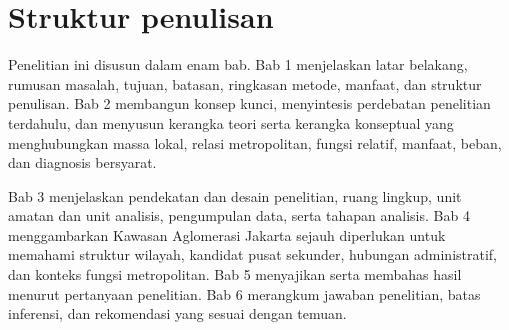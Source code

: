 \documentclass[11pt,a4paper,oneside,openany,indonesian]{report}
\begin{document}
\section{Struktur penulisan}

Penelitian ini disusun dalam enam bab. Bab 1 menjelaskan latar belakang, rumusan masalah, tujuan, batasan, ringkasan metode, manfaat, dan struktur penulisan. Bab 2 membangun konsep kunci, menyintesis perdebatan penelitian terdahulu, dan menyusun kerangka teori serta kerangka konseptual yang menghubungkan massa lokal, relasi metropolitan, fungsi relatif, manfaat, beban, dan diagnosis bersyarat.

Bab 3 menjelaskan pendekatan dan desain penelitian, ruang lingkup, unit amatan dan unit analisis, pengumpulan data, serta tahapan analisis. Bab 4 menggambarkan Kawasan Aglomerasi Jakarta sejauh diperlukan untuk memahami struktur wilayah, kandidat pusat sekunder, hubungan administratif, dan konteks fungsi metropolitan. Bab 5 menyajikan serta membahas hasil menurut pertanyaan penelitian. Bab 6 merangkum jawaban penelitian, batas inferensi, dan rekomendasi yang sesuai dengan temuan.

\printbibliography[heading=bibintoc,title={Daftar Pustaka}]
\end{document}
